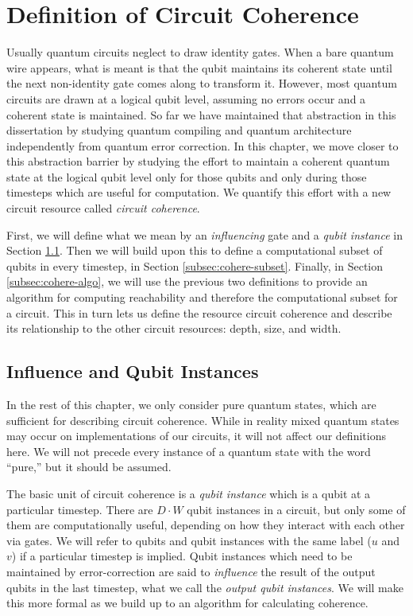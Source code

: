 \section{Definition of Circuit Coherence}
\label{sec:cohere-def}

Usually quantum circuits neglect to draw identity gates. When a bare
quantum wire appears, what is meant is that the qubit maintains its
coherent state until the next non-identity gate comes along to transform it.
However, most quantum circuits are drawn at a logical qubit level,
assuming no errors occur and a coherent state is maintained.
So far we have maintained that abstraction in this dissertation by studying
quantum compiling and quantum architecture independently from
quantum error correction. In this chapter, we move closer to
this abstraction barrier by studying
the effort to maintain a coherent quantum state at the logical qubit level
only for those qubits and only during those timesteps which are useful
for computation.
We quantify this effort with a new circuit resource called \emph{circuit coherence}.

First, we will define what we mean by an \emph{influencing} gate and
a \emph{qubit instance}
in Section \ref{subsec:cohere-entangle}. Then we will build upon this
to define a computational subset of qubits in every
timestep, in Section \ref{subsec:cohere-subset}. Finally,
in Section \ref{subsec:cohere-algo}, we will use
the previous two definitions to provide an algorithm for
computing reachability and therefore the computational subset for a circuit.
This in turn lets us define the resource circuit coherence and
describe its relationship to the other circuit resources: depth, size, and
width. 

\subsection{Influence and Qubit Instances}
\label{subsec:cohere-entangle}

In the rest of this chapter, we only consider pure quantum states, which are
sufficient for describing circuit coherence. While in reality
mixed quantum states may occur on implementations of our circuits, it
will not affect our definitions here. We will not precede every
instance of a quantum state with the word ``pure,'' but it should be
assumed.

The basic unit of circuit coherence is a \emph{qubit instance} which is
a qubit at a particular timestep. There are $D\cdot W$ qubit instances
in a circuit, but only some of them are computationally useful, depending
on how they interact with each other via gates. We will refer to
qubits and qubit instances with the same label ($u$ and $v$) if a particular
timestep is implied. Qubit instances which
need to be maintained by error-correction are said to \emph{influence}
the result of the output qubits in the last timestep, what we call
the \emph{output qubit instances}. We will make this more formal
as we build up to an algorithm for calculating coherence.


